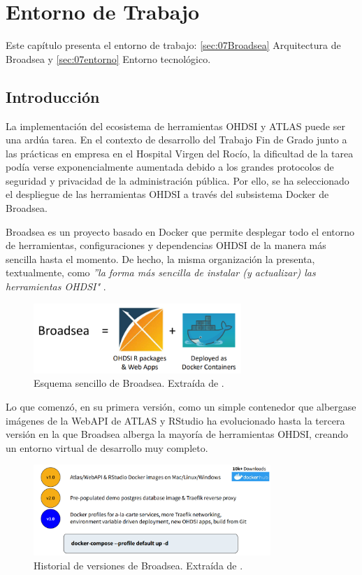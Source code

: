 \chapter{Entorno de Trabajo}\label{cap:07diseño}

Este capítulo presenta el entorno de trabajo: \ref{sec:07Broadsea} Arquitectura de Broadsea y \ref{sec:07entorno} Entorno tecnológico.

\section{Introducción}

La implementación del ecosistema de herramientas OHDSI y ATLAS puede ser una ardúa tarea. En el contexto de desarrollo del Trabajo Fin de Grado junto a las prácticas en empresa en el Hospital Virgen del Rocío, la dificultad de la tarea podía verse exponencialmente aumentada debido a los grandes protocolos de seguridad y privacidad de la administración pública. Por ello, se ha seleccionado el despliegue de las herramientas OHDSI a través del subsistema Docker de Broadsea. 

Broadsea es un proyecto basado en Docker que permite desplegar todo el entorno de herramientas, configuraciones y dependencias OHDSI de la manera más sencilla hasta el momento. De hecho, la misma organización la presenta, textualmente, como \textit{''la forma más sencilla de instalar (y actualizar) las herramientas OHDSI"} \cite{Broadsea3PDF}. 

\begin{figure}[H]
    \centering
    \includegraphics[width=0.70\textwidth]{figures/broadseaEq.png}
    \caption{Esquema sencillo de Broadsea. Extraída de \cite{Broadsea3PPTX}.}
    \label{fig:broadseaEq}
\end{figure}

Lo que comenzó, en su primera versión, como un simple contenedor que albergase imágenes de la WebAPI de ATLAS y RStudio \cite{Broadsea3PPTX} ha evolucionado hasta la tercera versión en la que Broadsea alberga la mayoría de herramientas OHDSI, creando un entorno virtual de desarrollo muy completo.

\begin{figure}[H]
    \centering
    \includegraphics[width=0.80\textwidth]{figures/versionesBroadsea.png}
    \caption{Historial de versiones de Broadsea. Extraída de \cite{Broadsea3PPTX}.}
    \label{fig:versionesBroadsea}
\end{figure}

